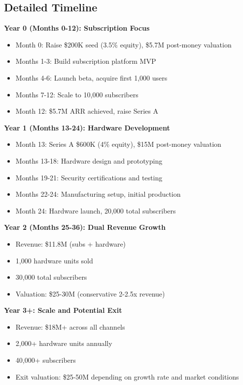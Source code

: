 \documentclass[11pt]{article}
\begin{document}
\subsection{Detailed Timeline}

\textbf{Year 0 (Months 0-12): Subscription Focus}
\begin{itemize}
  \item Month 0: Raise \$200K seed (3.5\% equity), \$5.7M post-money valuation
  \item Months 1-3: Build subscription platform MVP
  \item Months 4-6: Launch beta, acquire first 1,000 users
  \item Months 7-12: Scale to 10,000 subscribers
  \item Month 12: \$5.7M ARR achieved, raise Series A
\end{itemize}

\textbf{Year 1 (Months 13-24): Hardware Development}
\begin{itemize}
  \item Month 13: Series A \$600K (4\% equity), \$15M post-money valuation
  \item Months 13-18: Hardware design and prototyping
  \item Months 19-21: Security certifications and testing
  \item Months 22-24: Manufacturing setup, initial production
  \item Month 24: Hardware launch, 20,000 total subscribers
\end{itemize}

\textbf{Year 2 (Months 25-36): Dual Revenue Growth}
\begin{itemize}
  \item Revenue: \$11.8M (subs + hardware)
  \item 1,000 hardware units sold
  \item 30,000 total subscribers
  \item Valuation: \$25-30M (conservative 2-2.5x revenue)
\end{itemize}

\textbf{Year 3+: Scale and Potential Exit}
\begin{itemize}
  \item Revenue: \$18M+ across all channels
  \item 2,000+ hardware units annually
  \item 40,000+ subscribers
  \item Exit valuation: \$25-50M depending on growth rate and market conditions
\end{itemize}
\end{document}
